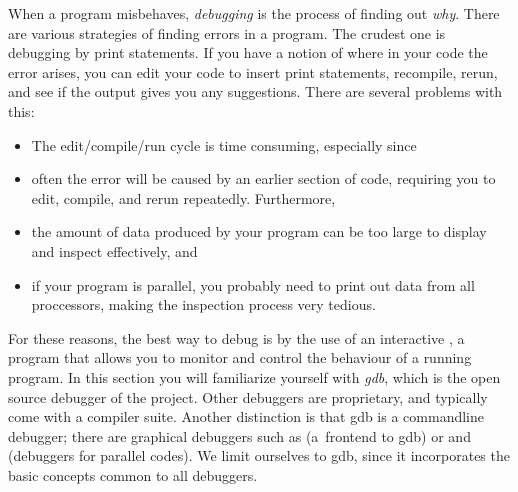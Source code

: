 

When a program misbehaves, \emph{debugging} is the process of finding
out \emph{why}.
There are various strategies of finding errors in a program.
The crudest one is debugging by print statements. If you have a
notion of where in your code the error arises, you can edit your code
to insert print statements, recompile, rerun, and see if the output
gives you any suggestions. There are several problems with this:
\begin{itemize}
\item The edit/compile/run cycle is time consuming, especially since
\item often the error will be caused by an earlier section of code,
  requiring you to edit, compile, and rerun repeatedly. Furthermore,
\item the amount of data produced by your program can be too large to
  display and inspect effectively, and
\item if your program is parallel, you probably need to print out data
  from all proccessors, making the inspection process very tedious.
\end{itemize}


For these reasons, the best way to debug is by the use of an
interactive , a program that allows you to monitor
and control the behaviour of a running program. In this section you
will familiarize yourself with
\emph{gdb}, which is the open source
debugger of the  project. Other debuggers are
proprietary, and typically come with a compiler suite. Another
distinction is that gdb is a commandline debugger; there are
graphical debuggers such as  (a~frontend to gdb) or
 and  (debuggers for parallel
codes). We limit ourselves to gdb, since it incorporates the basic
concepts common to all debuggers.

